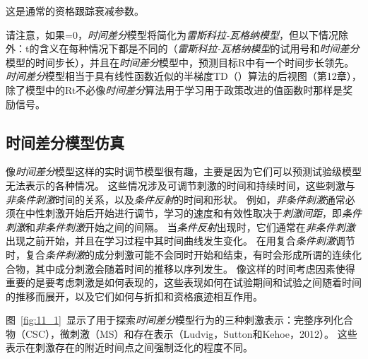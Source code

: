 {这是通常的资格跟踪衰减参数。

请注意，如果=0，\textit{时间差分}模型将简化为\textit{雷斯科拉-瓦格纳模型}，但以下情况除外：t的含义在每种情况下都是不同的（\textit{雷斯科拉-瓦格纳模型}的试用号和\textit{时间差分}模型的时间步长），并且在\textit{时间差分}模型中，预测目标R中有一个时间步长领先。
\textit{时间差分}模型相当于具有线性函数近似的半梯度TD（）算法的后视图（第12章），除了模型中的Rt不必像\textit{时间差分}算法用于学习用于政策改进的值函数时那样是奖励信号。



\subsection{时间差分模型仿真} \label{sec:td_simulation}

像\textit{时间差分}模型这样的实时调节模型很有趣，主要是因为它们可以预测试验级模型无法表示的各种情况。
这些情况涉及可调节刺激的时间和持续时间，这些刺激与\textit{非条件刺激}时间的关系，以及\textit{条件反射}的时间和形状。
例如，\textit{非条件刺激}通常必须在中性刺激开始后开始进行调节，学习的速度和有效性取决于\textit{刺激间距}，即\textit{条件刺激}和\textit{非条件刺激}开始之间的间隔。
当\textit{条件反射}出现时，它们通常在\textit{非条件刺激}出现之前开始，并且在学习过程中其时间曲线发生变化。
在用复合\textit{条件刺激}调节时，复合\textit{条件刺激}的成分刺激可能不会同时开始和结束，有时会形成所谓的连续化合物，其中成分刺激会随着时间的推移以序列发生。
像这样的时间考虑因素使得重要的是要考虑刺激是如何表现的，这些表现如何在试验期间和试验之间随着时间的推移而展开，以及它们如何与折扣和资格痕迹相互作用。


图~\ref{fig:11_1}~显示了用于探索\textit{时间差分}模型行为的三种刺激表示：完整序列化合物（CSC），微刺激（MS）和存在表示（Ludvig，Sutton和Kehoe，2012）。
这些表示在刺激存在的附近时间点之间强制泛化的程度不同。


}
